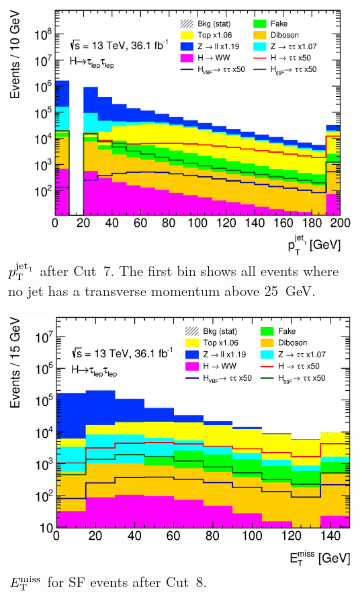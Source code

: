 \begin{figure}[htb]
\begin{subfigure}[t]{0.45\textwidth}
        \includegraphics[width=\textwidth]{./plots/event_selection/presel/ll-CutMVis-JetPt0-log.eps}
        \caption{$p_\text{T}^{\text{jet}_1}$ after Cut~7.
                 The first bin shows all events where no jet has a transverse momentum above \SI{25}{\GeV}.}\label{fig:event_selection:cutflow:jetlead}
    \end{subfigure}
    \begin{subfigure}[t]{0.45\textwidth}
        \includegraphics[width=\textwidth]{./plots/event_selection/presel/eemm-CutJet0Pt-MET-log.eps}
        \caption{$E_\text{T}^\text{miss}$ for SF events after Cut~8.}\label{fig:event_selection:cutflow:metsf}
    \end{subfigure}
    \begin{subfigure}[t]{0.45\textwidth}

\end{subfigure}
\end{figure}

